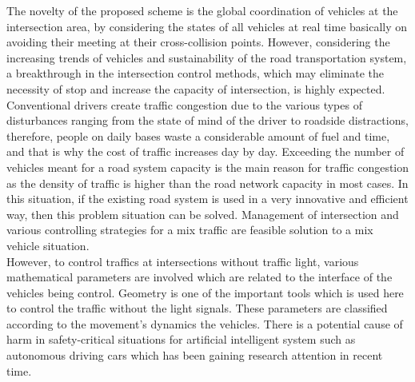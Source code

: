 \documentclass{book}
\begin{document}
The novelty of the proposed scheme is the global coordination of vehicles at the intersection area, by considering the states of all vehicles at real time basically on avoiding their meeting at their cross-collision points. However, considering the increasing trends of vehicles and sustainability of the road transportation system, a breakthrough in the intersection control methods, which may eliminate the necessity of stop and increase the capacity of intersection, is highly expected. Conventional drivers create traffic congestion due to the various types of disturbances ranging from the state of mind of the driver to roadside distractions, therefore, people on daily bases waste a considerable amount of fuel and time, and that is why the cost of traffic increases day by day. Exceeding the number of vehicles meant for a road system capacity is the main reason for traffic congestion as the density of traffic is higher than the road network capacity in most cases. In this situation, if the existing road system is used in a very innovative and efficient way, then this problem situation can be solved. Management of intersection and various controlling strategies for a mix traffic are feasible solution to a mix vehicle situation.\\
However, to control traffics at intersections without traffic light, various mathematical parameters are involved which are related to the interface of the vehicles being control. Geometry is one of the important tools which is used here to control the traffic without the light signals. These parameters are classified according to the movement's dynamics the vehicles. There is a  potential cause of harm in safety-critical situations for artificial intelligent system  such as autonomous driving cars which has been gaining research attention in recent time.
\end{document}
